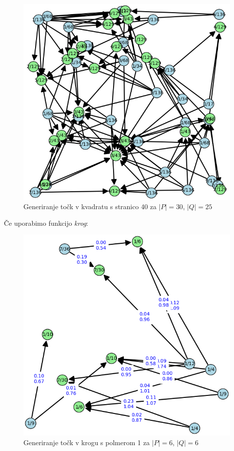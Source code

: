 \documentclass[a4paper, 11pt]{article}
\begin{document}
\begin{figure}[h!]
    \centering
    \includegraphics[scale=0.56]{kvadrat2.png}
    \caption{Generiranje točk v kvadratu s stranico 40 za $|P|=30$, $|Q|=25$}
\end{figure}
\noindent

Če uporabimo funkcijo \emph{krog}:
\begin{figure}[h!]
    \centering
    \includegraphics[scale=0.56]{krog.png}
    \caption{Generiranje točk v krogu s polmerom 1 za $|P|=6$, $|Q|=6$}
\end{figure}
\end{document}
